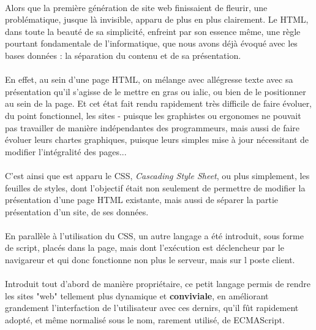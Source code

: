 {  %
  \paragraph{} Alors que la première génération de site web finissaient de fleurir, une
  problématique, jusque là invisible, apparu de plus en plus clairement. Le HTML, dans toute la
  beauté de sa simplicité, enfreint par son essence même, une règle pourtant fondamentale de
  l'informatique, que nous avons déjà évoqué avec les bases données : la séparation du contenu et de
  sa présentation.


  \paragraph{} En effet, au sein d'une page HTML, on mélange avec allégresse texte avec sa
  présentation qu'il s'agisse de le mettre en gras ou ialic, ou bien de le positionner au sein de la
  page. Et cet état fait rendu rapidement très difficile de faire évoluer, du point fonctionnel, les sites -
  puisque les graphistes ou ergonomes ne pouvait pas travailler de manière indépendantes des
  programmeurs, mais aussi de faire évoluer leurs chartes graphiques, puisque leurs simples mise à
  jour nécessitant de modifier l'intégralité des pages...

  \paragraph{} C'est ainsi que est apparu le CSS, \textit{Cascading Style Sheet}, ou plus
  simplement, les feuilles de styles, dont l'objectif était non seulement de permettre de modifier
  la présentation d'une page HTML existante, mais aussi de séparer la partie présentation d'un site,
  de ses données.

  \paragraph{} En parallèle à l'utilisation du CSS, un autre langage a été introduit, sous forme de
  script, placés dans la page, mais dont l'exécution est déclencheur par le navigareur et qui donc
  fonctionne non plus le serveur, mais sur l poste client.

  \paragraph{} Introduit tout d'abord de manière propriétaire, ce petit langage permis de rendre les
  sites "web" tellement plus dynamique et \textbf{conviviale}, en améliorant grandement
  l'interfaction de l'utilisateur avec ces dernirs, qu'il fût rapidement adopté, et même normalisé
  sous le nom, rarement utilisé, de ECMAScript.
}

